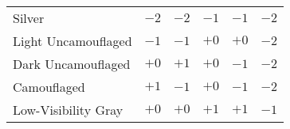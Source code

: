 {\begin{twocolumntablefloat}
\begin{multicols}{2}
{{\begin{onecolumntable}
\begin{tabularx}{\linewidth}{lCCCCC}
\toprule
&&&&&\\
\midrule
Silver               &$-2$&$-2$&$-1$&$-1$&$-2$\\
Light Uncamouflaged  &$-1$&$-1$&$+0$&$+0$&$-2$\\
Dark Uncamouflaged   &$+0$&$+1$&$+0$&$-1$&$-2$\\
Camouflaged          &$+1$&$-1$&$+0$&$-1$&$-2$\\
Low-Visibility Gray  &$+0$&$+0$&$+1$&$+1$&$-1$\\
\bottomrule
\end{tabularx}
\end{onecolumntable}
}
}

\end{multicols}


\end{twocolumntablefloat}}
